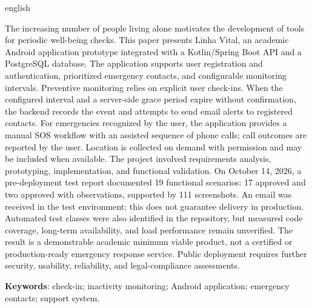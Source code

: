 \begin{resumo}[Abstract]
\begin{otherlanguage*}{english}

The increasing number of people living alone motivates the development of tools for periodic well-being checks. This paper presents Linha Vital, an academic Android application prototype integrated with a Kotlin/Spring Boot API and a PostgreSQL database. The application supports user registration and authentication, prioritized emergency contacts, and configurable monitoring intervals. Preventive monitoring relies on explicit user check-ins. When the configured interval and a server-side grace period expire without confirmation, the backend records the event and attempts to send email alerts to registered contacts. For emergencies recognized by the user, the application provides a manual SOS workflow with an assisted sequence of phone calls; call outcomes are reported by the user. Location is collected on demand with permission and may be included when available. The project involved requirements analysis, prototyping, implementation, and functional validation. On October 14, 2026, a pre-deployment test report documented 19 functional scenarios: 17 approved and two approved with observations, supported by 111 screenshots. An email was received in the test environment; this does not guarantee delivery in production. Automated test classes were also identified in the repository, but measured code coverage, long-term availability, and load performance remain unverified. The result is a demonstrable academic minimum viable product, not a certified or production-ready emergency response service. Public deployment requires further security, usability, reliability, and legal-compliance assessments.

\vspace{\onelineskip}
\noindent
\textbf{Keywords}: check-in; inactivity monitoring; Android application; emergency contacts; support system.
\end{otherlanguage*}
\end{resumo}
